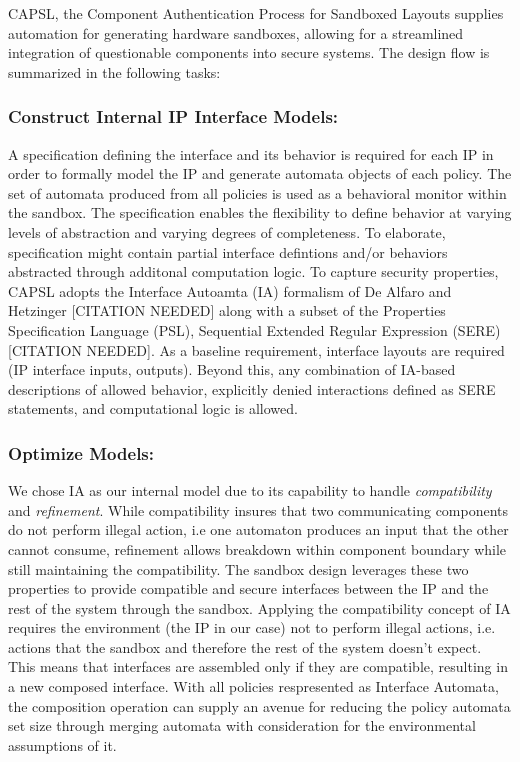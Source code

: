 \documentclass[sigconf]{acmart}
\theoremstyle{plain}
\theoremstyle{remark}
\begin{document}
CAPSL, the Component Authentication Process for Sandboxed Layouts supplies automation for generating hardware sandboxes, allowing for a streamlined integration of questionable components into secure systems. The design flow is summarized in the following tasks:

\subsubsection{Construct Internal IP Interface Models:}
A specification defining the interface and its behavior is required for each IP in order to formally model the IP and generate automata objects of each policy. The set of automata produced from all policies is used as a behavioral monitor within the sandbox. The specification enables the flexibility to define behavior at varying levels of abstraction and varying degrees of completeness. To elaborate, specification might contain partial interface defintions and/or behaviors abstracted through additonal computation logic. To capture security properties, CAPSL adopts the Interface Autoamta (IA) formalism of De Alfaro and Hetzinger [CITATION NEEDED] along with a subset of the Properties Specification Language (PSL), Sequential Extended Regular Expression (SERE) [CITATION NEEDED]. As a baseline requirement, interface layouts are required (IP interface inputs, outputs). Beyond this, any combination of IA-based descriptions of allowed behavior, explicitly denied interactions defined as SERE statements, and computational logic is allowed.


\subsubsection{Optimize Models:}
We chose IA as our internal model due to its capability to handle \textit{compatibility} and \textit{refinement}. While compatibility insures that two communicating components do not perform illegal action, i.e one automaton produces an input that the other cannot consume, refinement allows breakdown within component boundary while still maintaining the compatibility. The sandbox design leverages these two properties to provide compatible and secure interfaces between the IP and the rest of the system through the sandbox. Applying the compatibility concept of IA requires the environment (the IP in our case) not to perform illegal actions, i.e. actions that the sandbox and therefore the rest of  the system doesn't expect. This means that interfaces are assembled only if they are compatible, resulting in a new composed interface. With all policies respresented as Interface Automata, the composition operation can supply an avenue for reducing the policy automata set size through merging automata with consideration for the environmental assumptions of it.
\end{document}
